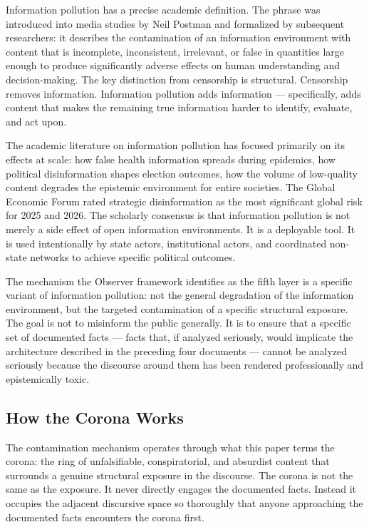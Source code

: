 \documentclass[11pt,a4paper]{article}
\begin{document}
Information pollution has a precise academic definition. The phrase was introduced into media studies by Neil Postman and formalized by subsequent researchers: it describes the contamination of an information environment with content that is incomplete, inconsistent, irrelevant, or false in quantities large enough to produce significantly adverse effects on human understanding and decision-making. The key distinction from censorship is structural. Censorship removes information. Information pollution adds information — specifically, adds content that makes the remaining true information harder to identify, evaluate, and act upon.


The academic literature on information pollution has focused primarily on its effects at scale: how false health information spreads during epidemics, how political disinformation shapes election outcomes, how the volume of low-quality content degrades the epistemic environment for entire societies. The Global Economic Forum rated strategic disinformation as the most significant global risk for 2025 and 2026. The scholarly consensus is that information pollution is not merely a side effect of open information environments. It is a deployable tool. It is used intentionally by state actors, institutional actors, and coordinated non-state networks to achieve specific political outcomes.


The mechanism the Observer framework identifies as the fifth layer is a specific variant of information pollution: not the general degradation of the information environment, but the targeted contamination of a specific structural exposure. The goal is not to misinform the public generally. It is to ensure that a specific set of documented facts — facts that, if analyzed seriously, would implicate the architecture described in the preceding four documents — cannot be analyzed seriously because the discourse around them has been rendered professionally and epistemically toxic.


\subsection{How the Corona Works}

The contamination mechanism operates through what this paper terms the corona: the ring of unfalsifiable, conspiratorial, and absurdist content that surrounds a genuine structural exposure in the discourse. The corona is not the same as the exposure. It never directly engages the documented facts. Instead it occupies the adjacent discursive space so thoroughly that anyone approaching the documented facts encounters the corona first.
\end{document}
